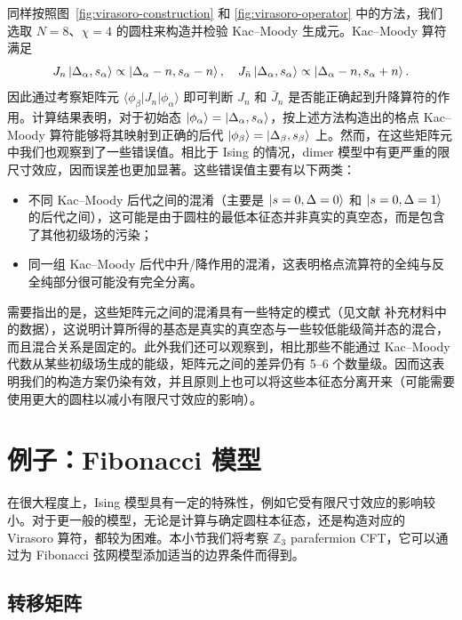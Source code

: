 同样按照图~\ref{fig:virasoro-construction} 和 \ref{fig:virasoro-operator} 中的方法，我们选取 $N=8$、$\chi=4$ 的圆柱来构造并检验 Kac--Moody 生成元。Kac--Moody 算符满足
\begin{equation}
  J_n         \ket{\Delta_\alpha, s_\alpha} \propto \ket{\Delta_\alpha-n, s_\alpha-n}, \quad
  J_{\bar{n}} \ket{\Delta_\alpha, s_\alpha} \propto \ket{\Delta_\alpha-n, s_\alpha+n}.
\end{equation}
因此通过考察矩阵元 $\langle\phi_\beta|J_n|\phi_\alpha\rangle$ 即可判断 $J_n$ 和 $\bar{J}_n$ 是否能正确起到升降算符的作用。计算结果表明，对于初始态 $\ket{\phi_\alpha}=\ket{\Delta_\alpha,s_\alpha}$，按上述方法构造出的格点 Kac--Moody 算符能够将其映射到正确的后代 $\ket{\phi_\beta}=\ket{\Delta_\beta,s_\beta}$ 上。然而，在这些矩阵元中我们也观察到了一些错误值。相比于 Ising 的情况，dimer 模型中有更严重的限尺寸效应，因而误差也更加显著。这些错误值主要有以下两类：

\begin{itemize}
  \item 不同 Kac--Moody 后代之间的混淆（主要是 $\ket{s=0,\Delta=0}$ 和 $\ket{s=0,\Delta=1}$ 的后代之间），这可能是由于圆柱的最低本征态并非真实的真空态，而是包含了其他初级场的污染；
  \item 同一组 Kac--Moody 后代中升/降作用的混淆，这表明格点流算符的全纯与反全纯部分很可能没有完全分离。
\end{itemize}

需要指出的是，这些矩阵元之间的混淆具有一些特定的模式（见文献 \parencite{wang2022virasoro} 补充材料中的数据），这说明计算所得的基态是真实的真空态与一些较低能级简并态的混合，而且混合关系是固定的。此外我们还可以观察到，相比那些不能通过 Kac--Moody 代数从某些初级场生成的能级，矩阵元之间的差异仍有 5--6 个数量级。因而这表明我们的构造方案仍染有效，并且原则上也可以将这些本征态分离开来（可能需要使用更大的圆柱以减小有限尺寸效应的影响）。

\section{例子：Fibonacci 模型}

在很大程度上，Ising 模型具有一定的特殊性，例如它受有限尺寸效应的影响较小。对于更一般的模型，无论是计算与确定圆柱本征态，还是构造对应的 Virasoro 算符，都较为困难。本小节我们将考察 $\mathbb{Z}_3$ parafermion CFT，它可以通过为 Fibonacci 弦网模型添加适当的边界条件而得到。

\subsection{转移矩阵}


